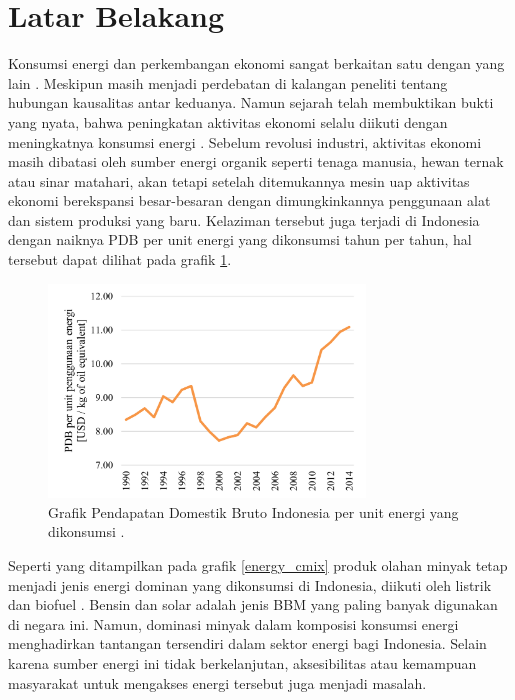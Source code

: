 \section{Latar Belakang}
\label{sec:latarbelakang}

Konsumsi energi dan perkembangan ekonomi sangat berkaitan satu dengan yang lain \citep{Burke2018Impact}. Meskipun masih menjadi perdebatan di kalangan peneliti tentang hubungan kausalitas antar keduanya. Namun sejarah telah membuktikan bukti yang nyata, bahwa peningkatan aktivitas ekonomi selalu diikuti dengan meningkatnya konsumsi energi \citep{Jack2024How}. Sebelum revolusi industri, aktivitas ekonomi masih dibatasi oleh sumber energi organik seperti tenaga manusia, hewan ternak atau sinar matahari, akan tetapi setelah ditemukannya mesin uap aktivitas ekonomi berekspansi besar-besaran dengan dimungkinkannya penggunaan alat dan sistem produksi yang baru. Kelaziman tersebut juga terjadi di Indonesia dengan naiknya PDB per unit energi yang dikonsumsi tahun per tahun, hal tersebut dapat dilihat pada grafik \ref{gdp_energy_unit}.
    \begin{figure}[htbp]
		\centerline{\includegraphics[width=0.75\textwidth]{grafik/gdp per unit energy consp v2.png}}
        \setlength{\belowcaptionskip}{-10pt}
		\caption{Grafik Pendapatan Domestik Bruto Indonesia per unit energi yang dikonsumsi \citep{World2024GDP}.}
		\label{gdp_energy_unit}
	\end{figure}
    
    Seperti yang ditampilkan pada grafik \ref{energy_cmix} produk olahan minyak tetap menjadi jenis energi dominan yang dikonsumsi di Indonesia, diikuti oleh listrik dan biofuel \citep{IEA2024World}. Bensin dan solar adalah jenis BBM yang paling banyak digunakan di negara ini. Namun, dominasi minyak dalam komposisi konsumsi energi menghadirkan tantangan tersendiri dalam sektor energi bagi Indonesia. Selain karena sumber energi ini tidak berkelanjutan, aksesibilitas atau kemampuan masyarakat untuk mengakses energi tersebut juga menjadi masalah.

